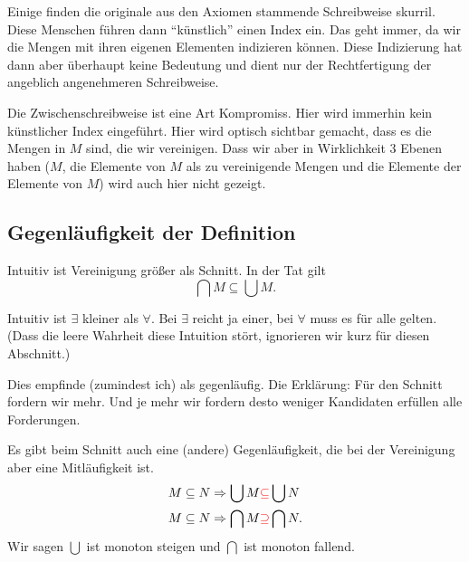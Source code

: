 \documentclass[a4paper]{amsart}
\theoremstyle{definition}
\begin{document}
Einige finden die originale aus den Axiomen stammende Schreibweise  skurril. Diese Menschen führen dann "`künstlich"' einen Index ein. Das geht immer, da wir die Mengen mit ihren eigenen Elementen indizieren können. Diese Indizierung hat dann aber überhaupt keine Bedeutung und dient nur der Rechtfertigung der angeblich angenehmeren Schreibweise.

Die Zwischenschreibweise ist eine Art Kompromiss. Hier wird immerhin kein künstlicher Index eingeführt. Hier wird optisch sichtbar gemacht, dass es die Mengen in $M$ sind, die wir vereinigen. Dass wir aber in Wirklichkeit $3$ Ebenen haben ($M$, die Elemente von $M$ als zu vereinigende Mengen und die Elemente der Elemente von $M$) wird auch hier nicht gezeigt.

\subsection{Gegenläufigkeit der Definition}
Intuitiv ist Vereinigung größer als Schnitt. In der Tat gilt
\begin{equation}\label{SchnittKleinerVereinigung}
   \bigcap M \subseteq \bigcup M.
\end{equation}

Intuitiv ist $\exists$ kleiner als $\forall$. Bei $\exists$ reicht ja einer, bei $\forall$ muss es für alle gelten. (Dass die leere Wahrheit diese Intuition stört, ignorieren wir kurz für diesen Abschnitt.)

Dies empfinde (zumindest ich) als gegenläufig. Die Erklärung: Für den Schnitt fordern wir mehr. Und je mehr wir fordern desto weniger Kandidaten erfüllen alle Forderungen.

Es gibt beim Schnitt auch eine (andere) Gegenläufigkeit, die bei der Vereinigung aber eine Mitläufigkeit ist.
\begin{alignat}{4}\label{leere}
   &M \subseteq N \Rightarrow \bigcup M {\color{red} \subseteq} \bigcup N\\
   &M \subseteq N \Rightarrow \bigcap M {\color{red} \supseteq} \bigcap N.
\end{alignat}
Wir sagen $\bigcup$ ist monoton steigen und $\bigcap$ ist monoton fallend.

\end{document}
